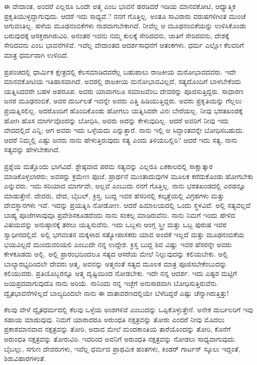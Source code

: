 ಈ ವೇದಾಂತ, ಅಂದರೆ ಎಲ್ಲರೂ ಒಂದೇ ಆತ್ಮ ಎಂಬ ಭಾವನೆ ಹರಡಿದರೆ ಇಡಿಯ ಮಾನವಕೋಟಿ, ಆಧ್ಯಾತ್ಮಿಕ ಪ್ರಕೃತಿಯುಳ್ಳದ್ದಾಗುವುದು. ಆದರೆ ಇದು ಸಾಧ್ಯವೆ.? ನನಗೆ ಗೊತ್ತಿಲ್ಲ. ಅಂತೂ ಸಾವಿರಾರು ವರುಷಗಳಿಗಿಂತ ಮುಂಚೆ ಆಗುವಂತಿಲ್ಲ. ಹಳೆಯ ಮೂಢನಂಬಿಕೆಗಳು ನಾಶವಾಗಬೇಕಾಗಿದೆ. ನೀವೆಲ್ಲ ಆ ಮೂಢನಂಬಿಕೆಯನ್ನು ಉಳಿಸಿಕೊಂಡು ಬರುವುದಕ್ಕೆ ಆಸಕ್ತರಾಗಿರುವಿರಿ. ಅನಂತರ ಇವನು ನಮ್ಮ ಕುಲಕ್ಕೆ ಸೇರಿದವನು, ಜಾತಿಗೆ ಸೇರಿದವನು, ದೇಶಕ್ಕೆ ಸೇರಿದವನು ಎಂಬ ಭಾವನೆಗಳಿವೆ. ಇವೆಲ್ಲ ವೇದಾಂತದ ಆದರ್ಶಸಾಧನೆಗೆ ಆತಂಕಗಳು. ಧರ್ಮ ಎಲ್ಲೋ ಕೆಲವರಿಗೆ ಮಾತ್ರ ಧರ್ಮವಾಗಿ ಉಳಿದಿದೆ.

ಪ್ರಪಂಚದಲ್ಲಿ ಧಾರ್ಮಿಕ ಕ್ಷೇತ್ರದಲ್ಲಿ ಕೆಲಸಮಾಡಿದವರೆಲ್ಲ ಬಹುಪಾಲು ರಾಜಕೀಯ ಮನೋಭಾವದವರು. ಇದೇ ಮಾನವಕೋಟಿಯ ಇತಿಹಾಸವಾಗಿದೆ. ಅವರಲ್ಲಿ ರಾಜಕೀಯ ಮನೋಭಾವವಿಲ್ಲದೆ, ಸತ್ಯದೊಂದಿಗೆ ಬಾಳಬೇಕೆಂದು ಯತ್ನಿಸಿದವರೇ ಬಹಳ ಅಪರೂಪ. ಅವರು ಯಾವಾಗಲೂ ಸಮಾಜವೆಂಬ ದೇವರನ್ನು ಪೂಜಿಸುತ್ತಿದ್ದರು. ಸಾಧಾರಣ ಜನರ ಮೂಢನಂಬಿಕೆ, ಅವರ ದುರ್ಬಲತೆ ಇವನ್ನೇ ಅವರು ಎತ್ತಿ ಹಿಡಿಯುತ್ತಿದ್ದರು. ಅವರು ಪ್ರಕೃತಿಯನ್ನು ಗೆಲ್ಲಲು ಪ್ರಯತ್ನಿಸಲಿಲ್ಲ. ಅದರೊಂದಿಗೆ ಹೊಂದಿಕೊಂಡು ಹೋಗಲು ಯತ್ನಿಸಿದರೇ ವಿನಃ ಬೇರೆಯಲ್ಲ. ನೀವು ಭರತಖಂಡಕ್ಕೆ ಹೋಗಿ ಹೊಸ ಮಾರ್ಗವೊಂದನ್ನು ಬೋಧಿಸಿ, ಅವರು ಅದನ್ನು ಕೇಳುವುದಿಲ್ಲ. ಆದರೆ ಅವರಿಗೆ ನೀವು ಇದು ವೇದದಲ್ಲಿದೆ ಎನ್ನಿ; ಆಗ ಅವರು ಇದು ಒಳ್ಳೆಯದು ಎನ್ನುತ್ತಾರೆ. ನಾನು ಇಲ್ಲಿ ಆ ಸಿದ್ದಾಂತವನ್ನೇ ಬೋಧಿಸಬಹುದು. ಆದರೆ ನಿಮ್ಮಲ್ಲಿ ಎಷ್ಟು ಜನರು ನಾನು ಹೇಳುತ್ತಿರುವುದು ಸತ್ಯ ಎಂದು ತಿಳಿಯಬಲ್ಲಿರಿ? ಆದರೆ ಇದು ಸತ್ಯ, ನಾನು ಸತ್ಯವನ್ನು ಹೇಳಬೇಕಾಗಿದೆ.

ಪ್ರಶ್ನೆಯ ಮತ್ತೊಂದು ಭಾಗವಿದೆ. ಶ್ರೇಷ್ಠವಾದ ಪರಮ ಸತ್ಯವನ್ನು ಎಲ್ಲರೂ ಏಕಕಾಲದಲ್ಲಿ ಸಾಕ್ಷಾತ್ಕಾರ ಮಾಡಿಕೊಳ್ಳಲಾರರು; ಅವರನ್ನು ಕ್ರಮೇಣ ಪೂಜೆ, ಪ್ರಾರ್ಥನೆ ಮುಂತಾದುವುಗಳ ಮೂಲಕ ಕರೆದುಕೊಂಡು ಹೋಗಬೇಕು ಎನ್ನುವರು. ಇದು ಸರಿಯಾದ ಮಾರ್ಗವೇ, ಅಲ್ಲವೆ ಎಂಬುದು ನನಗೆ ಗೊತ್ತಿಲ್ಲ. ನಾನು ಭರತಖಂಡದಲ್ಲಿ ಎರಡನ್ನೂ ಮಾಡುತ್ತೇನೆ. ದೇವರು, ವೇದ, ಬೈಬಲ್, ಕ್ರಿಸ್ತ, ಬುದ್ದ ಇವರ ಹೆಸರಿನಲ್ಲಿ ಕಲ್ಕತ್ತೆಯಲ್ಲಿ ವಿಗ್ರಹಗಳು ಮತ್ತು ದೇವಸ್ಥಾನಗಳು ಇವೆ. ಇದನ್ನು ಪ್ರಯತ್ನಿಸಿ ನೋಡೋಣ. ಆದರೆ ಹಿಮಾಲಯದಲ್ಲಿ ಒಂದು ಸ್ಥಳವಿದೆ. ಅಲ್ಲಿ ಸತ್ಯವಲ್ಲದೆ ಬಾಹ್ಯ ಪೂಜೆಗಳಾವುವೂ ಪ್ರವೇಶಿಸಕೂಡದೆಂದು ನಾನು ಸಂಕಲ್ಪ ಮಾಡಿರುವೆನು. ನಾನು ನಿಮಗೆ ಇಂದು ಹೇಳಿದ ವಿಷಯವನ್ನು ಅನುಷ್ಠಾನಕ್ಕೆ ತರಲು ಯತ್ನಿಸುವೆನು. ಇದು ಒಬ್ಬಳು ಆಂಗ್ಲ ಸ್ತ್ರೀ ಮತ್ತು ಒಬ್ಬ ಪುರುಷ ಇವರ ಸ್ವಾಧೀನದಲ್ಲಿದೆ. ಅಲ್ಲಿ ಭಗವಂತನ ಮಕ್ಕಳಾದ ಸತ್ಯೋಪಾಸಕರು ಯಾವ ಅಂಜಿಕೆ ಇಲ್ಲದೆ ಮತ್ತು ಮೂಢನಂಬಿಕೆಯ ಭಯವಿಲ್ಲದೆ ಮುಂದುವರಿಯಲಿ ಎಂಬುದೇ ನನ್ನ ಉದ್ದೇಶ. ಕ್ರಿಸ್ತ ಬುದ್ದ ಶಿವ ವಿಷ್ಣು ಇವರ ಹೆಸರನ್ನೇ ಅವರು ಕೇಳಕೂಡದು ಅಲ್ಲಿ. ಅಲ್ಲಿ ಪ್ರಾರಂಭದಿಂದಲೂ ಸತ್ಯದ ಆಸರೆಯ ಮೇಲೆ ನಿಲ್ಲುವುದನ್ನು ಕಲಿಯಬೇಕು. ಅಲ್ಲಿ ಬಾಲ್ಯಾರಭ್ಯದಿಂದಲೇ ದೇವರು ಆತ್ಮ, ಅವನನ್ನು ಆತ್ಮನಂತೆ ಸತ್ಯದ ಮೂಲಕ ಮಾತ್ರ ಪೂಜಿಸಬೇಕೆಂಬುದನ್ನು ಕಲಿಯುವರು. ಪ್ರತಿಯೊಬ್ಬರನ್ನೂ ಆತ್ಮ ದೃಷ್ಟಿಯಿಂದ ನೋಡಬೇಕು. ಇದೇ ನನ್ನ ಆದರ್ಶ. ಇದು ಎಷ್ಟರ ಮಟ್ಟಿಗೆ ಜಯಪ್ರದವಾಗುವುದೊ ನಾನು ಅರಿಯೆ. ನಾನಿಂದು ನನ್ನ ಇಚ್ಛೆಗೆ ಅನುಸಾರವಾಗಿ ಬೋಧಿಸುತ್ತಿರುವೆನು. ದ್ವೈತಭಾವನೆಗಳಿಲ್ಲದೆ ಬಾಲ್ಯದಿಂದಲೇ ನಾನು ಈ ವಾತಾವರಣದಲ್ಲಿಯೇ ಬೆಳೆದಿದ್ದರೆ ಎಷ್ಟು ಚೆನ್ನಾಗಿರುತ್ತಿತ್ತು!

ಕೆಲವು ವೇಳೆ ದ್ವೈತಧರ್ಮದಲ್ಲಿ ಕೆಲವು ಒಳ್ಳೆಯ ಅಂಶಗಳಿವೆ ಎಂಬುದನ್ನು ಒಪ್ಪಿಕೊಳ್ಳುತ್ತೇನೆ. ಅನೇಕ ದುರ್ಬಲರಿಗೆ ಇವು ಸಹಾಯ ಮಾಡುವುವು. ನಿಮಗೆ ಯಾರಾದರೂ ಅರುಂಧತಿ ನಕ್ಷತ್ರವನ್ನು ತೋರು ಎಂದರೆ ನೀವು ಮೊದಲು ಪ್ರಕಾಶಮಾನವಾದ ನಕ್ಷತ್ರವನ್ನು ತೋರಿ, ಅದಾದ ಮೇಲೆ ಮಂದಕಾಂತಿಯ ತಾರೆಯೊಂದನ್ನು ತೋರಿ, ಕೊನೆಗೆ ಅರುಂಧತಿ ನಕ್ಷತ್ರವನ್ನು ತೋರುವಿರಿ. ಇದರಿಂದ ಅವನಿಗೆ ಅರುಂಧತಿ ನಕ್ಷತ್ರವನ್ನು ನೋಡಲು ಸಾಧ್ಯವಾಗುವುದು. ಬೈಬಲ್ಲು, ಸಗುಣ ದೇವರುಗಳು, ಇವೆಲ್ಲ ಧರ್ಮದ ಪ್ರಾಥಮಿಕ ಹಂತಗಳು, ಕಿಂಡರ್ ಗಾರ್ಟನ್ ಸ್ಕೂಲು ಇದ್ದಂತೆ, ಶಿಶುವಿಹಾರಗಳಂತೆ.

